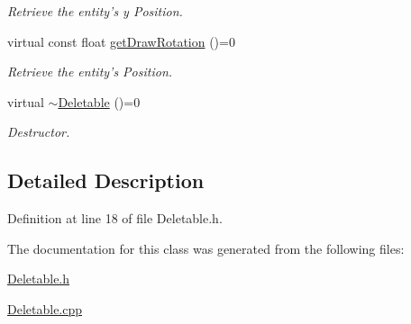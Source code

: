 \begin{DoxyCompactItemize}
\begin{DoxyCompactList}\small\item\em Retrieve the entity's y Position. \end{DoxyCompactList}\item 
\hypertarget{class_deletable_ad7061a6bef3efce030aa5abbc7646d47}{virtual const float \hyperlink{class_deletable_ad7061a6bef3efce030aa5abbc7646d47}{get\+Draw\+Rotation} ()=0}\label{class_deletable_ad7061a6bef3efce030aa5abbc7646d47}

\begin{DoxyCompactList}\small\item\em Retrieve the entity's Position. \end{DoxyCompactList}\item 
\hypertarget{class_deletable_a20633231281c5a7110389a3f416f4989}{virtual \hyperlink{class_deletable_a20633231281c5a7110389a3f416f4989}{$\sim$\+Deletable} ()=0}\label{class_deletable_a20633231281c5a7110389a3f416f4989}

\begin{DoxyCompactList}\small\item\em Destructor. \end{DoxyCompactList}\end{DoxyCompactItemize}


\subsection{Detailed Description}


Definition at line 18 of file Deletable.\+h.



The documentation for this class was generated from the following files\+:\begin{DoxyCompactItemize}
\item 
\hyperlink{_deletable_8h}{Deletable.\+h}\item 
\hyperlink{_deletable_8cpp}{Deletable.\+cpp}\end{DoxyCompactItemize}
